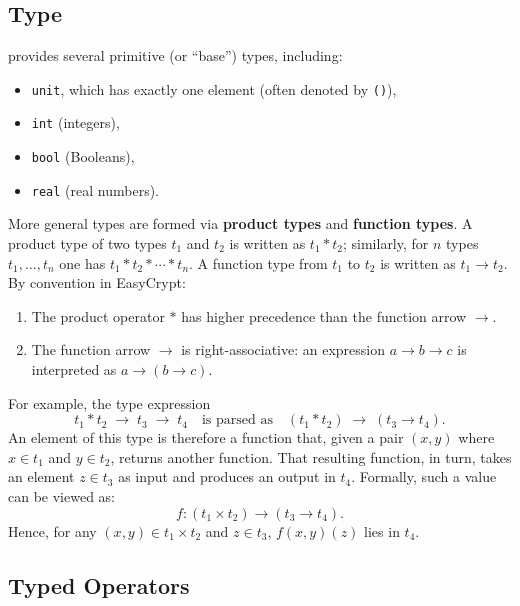 \newpage
\subsection{Type}
\EasyCrypt provides several primitive (or ``base'') types, including:
\begin{itemize}
	\item \texttt{unit}, which has exactly one element (often denoted by \texttt{()}),
	\item \texttt{int} (integers),
	\item \texttt{bool} (Booleans),
	\item \texttt{real} (real numbers).
\end{itemize}

More general types are formed via \textbf{product types} and \textbf{function types}. 
A product type of two types \(t_1\) and \(t_2\) is written as \(t_1 * t_2\); similarly, for \(n\) types \(t_1,\dots,t_n\) one has \(t_1 * t_2 * \cdots * t_n\). A function type from \(t_1\) to \(t_2\) is written as \(t_1 \to t_2\). By convention in EasyCrypt:
\begin{enumerate}
	\item The product operator $*$ has higher precedence than the function arrow $\to$.
	\item The function arrow $\to$ is right-associative: an expression $a\to b\to c$ is interpreted as $a\to(b\to c)$.
\end{enumerate}
For example, the type expression \[
t_1 * t_2 \; \to \; t_3 \; \to \; t_4\quad\text{is parsed as}\quad (t_1 * t_2) \;\to\; (t_3 \to t_4).
\]
An element of this type is therefore a function that, given a pair \((x,y)\) where \(x \in t_1\) and \(y \in t_2\), returns another function. That resulting function, in turn, takes an element \(z \in t_3\) as input and produces an output in \(t_4\). Formally, such a value can be viewed as:  
\[
f : (t_1 \times t_2) \to (t_3 \to t_4).
\]  
Hence, for any \((x,y)\in t_1\times t_2\) and \(z\in t_3\), \(f(x,y)(z)\) lies in \(t_4\).


\newpage
\subsection{Typed Operators}

